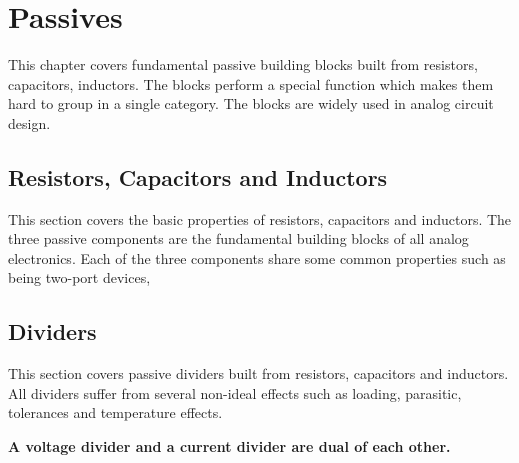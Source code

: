 \chapter{Passives}

This chapter covers fundamental passive building blocks
built from resistors, capacitors, inductors. The blocks
perform a special function which makes them hard to group
in a single category. The blocks are widely used in
analog circuit design.

\section{Resistors, Capacitors and Inductors}
This section covers the basic properties of resistors,
capacitors and inductors. The three passive components are the
fundamental building blocks of all analog electronics.
Each of the three components share some common properties such
as being two-port devices,


\section{Dividers}
This section covers passive dividers built from resistors,
capacitors and inductors. All dividers suffer from several
non-ideal effects such as loading, parasitic, tolerances
and temperature effects.

\textbf{A voltage divider and a current divider are dual of each
other.}







